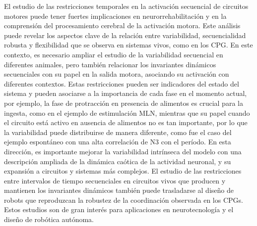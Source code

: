 El estudio de las restricciones temporales en la activación secuencial de circuitos motores puede tener fuertes implicaciones en neurorrehabilitación y en la comprensión del procesamiento cerebral de la activación motora. Este análisis puede revelar los aspectos clave de la relación entre variabilidad, secuencialidad robusta y flexibilidad que se observa en sistemas vivos, como en los CPG. En este contexto, es necesario ampliar el estudio de la variabilidad secuencial en diferentes animales, pero también relacionar los invariantes dinámicos secuenciales con su papel en la salida motora, asociando su activación con diferentes contextos. Estas restricciones pueden ser indicadores del estado del sistema y pueden asociarse a la importancia de cada fase en el momento actual, por ejemplo, la fase de protracción en presencia de alimentos es crucial para la ingesta, como en el ejemplo de estimulación MLN, mientras que su papel cuando el circuito está activo en ausencia de alimentos no es tan importante, por lo que la variabilidad puede distribuirse de manera diferente, como fue el caso del ejemplo espontáneo con una alta correlación de N3 con el período. En esta dirección, es importante mejorar la variabilidad intrínseca del modelo con una descripción ampliada de la dinámica caótica de la actividad neuronal, y su expansión a circuitos y sistemas más complejos. El estudio de las restricciones entre intervalos de tiempo secuenciales en circuitos vivos que producen y mantienen los invariantes dinámicos también puede trasladarse al diseño de robots que reproduzcan la robustez de la coordinación observada en los CPGs. Estos estudios son de gran interés para aplicaciones en neurotecnología y el diseño de robótica autónoma.

